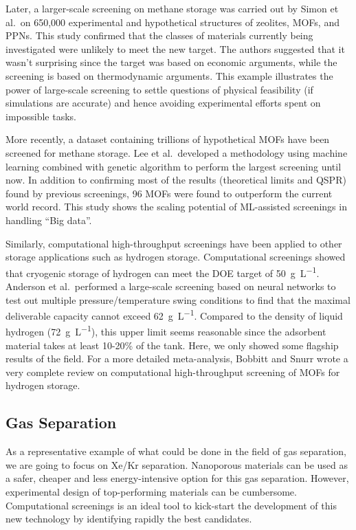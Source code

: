 \documentclass[main.tex]{subfiles}
\begin{document}
Later, a larger-scale screening on methane storage was carried out by Simon et al.\ on 650,000 experimental and hypothetical structures of zeolites, MOFs, and PPNs. This study confirmed that the classes of materials currently being investigated were unlikely to meet the new target. The authors suggested that it wasn't surprising since the target was based on economic arguments, while the screening is based on thermodynamic arguments.\cite{Simon_2015_EES} This example illustrates the power of large-scale screening to settle questions of physical feasibility (if simulations are accurate) and hence avoiding experimental efforts spent on impossible tasks.

More recently, a dataset containing trillions of hypothetical MOFs have been screened for methane storage.\cite{Lee_2021} Lee et al.\ developed a methodology using machine learning combined with genetic algorithm to perform the largest screening until now. In addition to confirming most of the results (theoretical limits and QSPR) found by previous screenings, 96 MOFs were found to outperform the current world record. This study shows the scaling potential of ML-assisted screenings in handling ``Big data''.

Similarly, computational high-throughput screenings have been applied to other storage applications such as hydrogen storage. Computational screenings showed that cryogenic storage of hydrogen can meet the DOE target of \SI{50}{\gram\per\liter}.\cite{Gomez_Gualdron_2016, Bobbitt_2016, Thornton_2017} Anderson et al.\ performed a large-scale screening based on neural networks to test out multiple pressure/temperature swing conditions to find that the maximal deliverable capacity cannot exceed \SI{62}{\gram\per\liter}.\cite{Anderson_2018} Compared to the density of liquid hydrogen (\SI{72}{\gram\per\liter}), this upper limit seems reasonable since the adsorbent material takes at least {10-20\%} of the tank. Here, we only showed some flagship results of the field. For a more detailed meta-analysis, Bobbitt and Snurr wrote a very complete review on computational high-throughput screening of MOFs for hydrogen storage.\cite{Bobbitt_2019}

\subsection{Gas Separation}

As a representative example of what could be done in the field of gas separation, we are going to focus on Xe/Kr separation. Nanoporous materials can be used as a safer, cheaper and less energy-intensive option for this gas separation. However, experimental design of top-performing materials can be cumbersome. Computational screenings is an ideal tool to kick-start the development of this new technology by identifying rapidly the best candidates.
\end{document}
